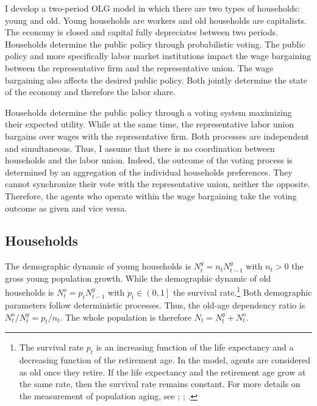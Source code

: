

I develop a two-period OLG model in which there are two types of households: young and old. Young households are workers and old households are capitalists. The economy is closed and capital fully depreciates between two periods.
Households determine the public policy through probabilistic voting. The public policy and more specifically labor market institutions impact the wage bargaining between the representative firm and the representative union. The wage bargaining also affects the desired public policy. Both jointly determine the state of the economy and therefore the labor share.

Households determine the public policy through a voting system maximizing their expected utility. While at the same time, the representative labor union bargains over wages with the representative firm. Both processes are independent and simultaneous. Thus, I assume that there is no coordination between households and the labor union. Indeed, the outcome of the voting process is determined by an aggregation of the individual households preferences. They cannot synchronize their vote with the representative union, neither the opposite. Therefore, the agents who operate within the wage bargaining take the voting outcome as given and vice versa.

\subsection{Households}\label{subsec:households}

The demographic dynamic of young households is $N^y_t = n_t N^y_{t-1}$ with $n_t > 0$ the gross young population growth. While the demographic dynamic of old households is $N^o_t = p_t N^y_{t-1}$ with $p_t \in \left(0,1\right]$ the survival rate.\footnote{The survival rate $p_t$ is an increasing function of the life expectancy and a decreasing function of the retirement age. In the model, agents are considered as old once they retire. If the life expectancy and the retirement age grow at the same rate, then the survival rate remains constant. For more details on the measurement of population aging, see \cite{Sanderson2007}; \cite{Sanderson2013}; \cite{DAlbis2013}.} Both demographic parameters follow deterministic processes. Thus, the old-age dependency ratio is $N^o_t/N^y_t = p_t/n_t$. The whole population is therefore $N_t = N^y_t + N^o_t$.

